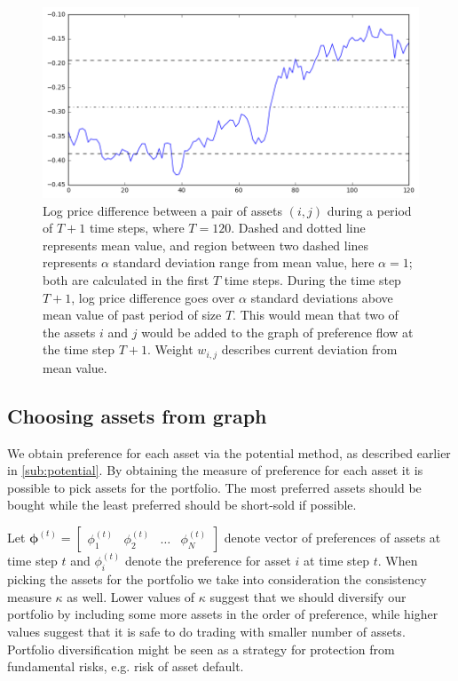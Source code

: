 \documentclass[letterpaper, 10pt, conference]{ieeeconf}
\newcommand{\matr}[1]{\mathbold{#1}}
\begin{document}
  \begin{figure}[h]
    \centering
    \includegraphics[width=0.9\columnwidth]{graphics/deviation-magnitude.png}
    \caption{Log price difference between a pair of assets $(i, j)$ during a period of $T + 1$ time steps, where $T = 120$.
    Dashed and dotted line represents mean value, and region between two dashed lines represents $\alpha$ standard deviation range from mean value, here $\alpha = 1$; both are calculated in the first $T$ time steps.
    During the time step $T + 1$, log price difference goes over $\alpha$ standard deviations above mean value of past period of size $T$.
    This would mean that two of the assets $i$ and $j$ would be added to the graph of preference flow at the time step $T + 1$.
    Weight $w_{i,j}$ describes current deviation from mean value.}
    \label{fig:devmag}
  \end{figure}
  
  \subsection{Choosing assets from graph}
  We obtain preference for each asset via the potential method, as described earlier in \ref{sub:potential}.
  By obtaining the measure of preference for each asset it is possible to pick assets for the portfolio.
  The most preferred assets should be bought while the least preferred should be short-sold if possible.
  
  Let $\matr{\phi}^{(t)} = \begin{bmatrix} \phi_1^{(t)} & \phi_2^{(t)} & \ldots & \phi_N^{(t)} \end{bmatrix}$ denote vector of preferences of assets at time step $t$ and $\phi_i^{(t)}$ denote the preference for asset $i$ at time step $t$.
  When picking the assets for the portfolio we take into consideration the consistency measure $\kappa$ as well.
  Lower values of $\kappa$ suggest that we should diversify our portfolio by including some more assets in the order of preference, while higher values suggest that it is safe to do trading with smaller number of assets.
  Portfolio diversification might be seen as a strategy for protection from fundamental risks, e.g. risk of asset default.
  
\end{document}
